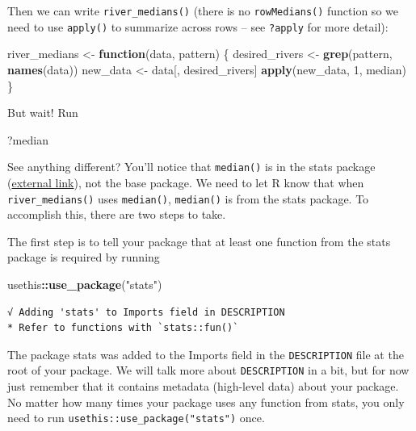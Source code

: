 \documentclass[
]{book}
\newenvironment{Shaded}{\begin{snugshade}}{\end{snugshade}}
\newcommand{\ControlFlowTok}[1]{\textcolor[rgb]{0.13,0.29,0.53}{\textbf{#1}}}
\newcommand{\DecValTok}[1]{\textcolor[rgb]{0.00,0.00,0.81}{#1}}
\newcommand{\KeywordTok}[1]{\textcolor[rgb]{0.13,0.29,0.53}{\textbf{#1}}}
\newcommand{\NormalTok}[1]{#1}
\newcommand{\OperatorTok}[1]{\textcolor[rgb]{0.81,0.36,0.00}{\textbf{#1}}}
\newcommand{\StringTok}[1]{\textcolor[rgb]{0.31,0.60,0.02}{#1}}
\begin{document}
Then we can write \texttt{river\_medians()} (there is no \texttt{rowMedians()} function so we need to use \texttt{apply()} to summarize across rows -- see \texttt{?apply} for more detail):

\begin{Shaded}
\begin{Highlighting}[]
\NormalTok{river_medians <-}\StringTok{ }\ControlFlowTok{function}\NormalTok{(data, pattern) \{}
\NormalTok{  desired_rivers <-}\StringTok{ }\KeywordTok{grep}\NormalTok{(pattern, }\KeywordTok{names}\NormalTok{(data))}
\NormalTok{  new_data <-}\StringTok{ }\NormalTok{data[, desired_rivers]}
  \KeywordTok{apply}\NormalTok{(new_data, }\DecValTok{1}\NormalTok{, median)}
\NormalTok{\}}
\end{Highlighting}
\end{Shaded}

But wait! Run

\begin{Shaded}
\begin{Highlighting}[]
\NormalTok{?median}
\end{Highlighting}
\end{Shaded}

See anything different? You'll notice that \texttt{median()} is in the stats package (\href{https://stat.ethz.ch/R-manual/R-devel/library/stats/html/00Index.html}{external link}), not the base package. We need to let R know that when \texttt{river\_medians()} uses \texttt{median()}, \texttt{median()} is from the stats package. To accomplish this, there are two steps to take.

The first step is to tell your package that at least one function from the stats package is required by running

\begin{Shaded}
\begin{Highlighting}[]
\NormalTok{usethis}\OperatorTok{::}\KeywordTok{use_package}\NormalTok{(}\StringTok{"stats"}\NormalTok{)}
\end{Highlighting}
\end{Shaded}

\begin{verbatim}
√ Adding 'stats' to Imports field in DESCRIPTION
* Refer to functions with `stats::fun()`
\end{verbatim}

The package stats was added to the Imports field in the \texttt{DESCRIPTION} file at the root of your package. We will talk more about \texttt{DESCRIPTION} in a bit, but for now just remember that it contains metadata (high-level data) about your package. No matter how many times your package uses any function from stats, you only need to run \texttt{usethis::use\_package("stats")} once.
\end{document}
